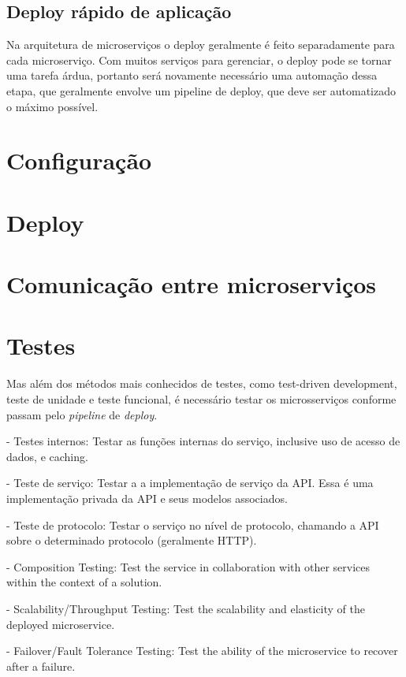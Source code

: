 \subsection{Deploy rápido de aplicação}

Na arquitetura de microserviços o deploy geralmente é feito separadamente para cada microserviço. Com muitos serviços para gerenciar, o deploy pode se tornar uma tarefa árdua, portanto será novamente necessário uma automação dessa etapa, que geralmente envolve um pipeline de deploy, que deve ser automatizado o máximo possível.

\section{Configuração}

\section{Deploy}

\section{Comunicação entre microserviços}

\section{Testes}

Mas além dos métodos mais conhecidos de testes, como test-driven development, teste de unidade e teste funcional, é necessário testar os microsserviços conforme passam pelo \emph{pipeline} de \emph{deploy}.

- Testes internos: Testar as funções internas do serviço, inclusive uso de acesso de dados, e caching.

- Teste de serviço: Testar a a implementação de serviço da API. Essa é uma implementação privada da API e seus modelos associados.

- Teste de protocolo: Testar o serviço no nível de protocolo, chamando a API sobre o determinado protocolo (geralmente HTTP).

- Composition Testing: Test the service in collaboration with other services within the context of a solution.

- Scalability/Throughput Testing: Test the scalability and elasticity of the deployed microservice.

- Failover/Fault Tolerance Testing: Test the ability of the microservice to recover after a failure.

